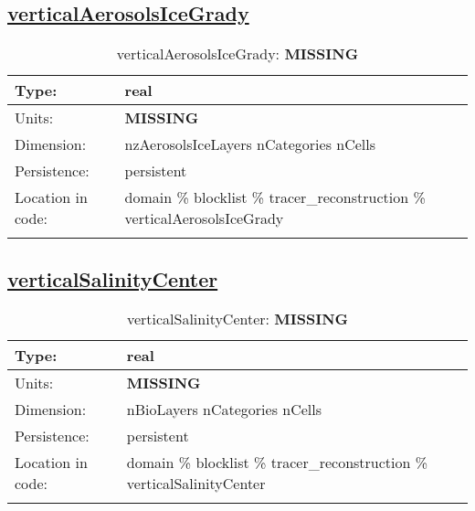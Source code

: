 \subsection[verticalAerosolsIceGrady]{\hyperref[sec:var_tab_tracer_reconstruction]{verticalAerosolsIceGrady}}
\label{subsec:var_sec_tracer_reconstruction_verticalAerosolsIceGrady}
\begin{center}
\begin{longtable}{| p{2.0in} | p{4.0in} |}
        \hline 
        Type: & real \\
        \hline 
        Units: & {\bf \color{red} MISSING} \\
        \hline 
        Dimension: & nzAerosolsIceLayers nCategories nCells \\
        \hline 
        Persistence: & persistent \\
        \hline 
         Location in code: & domain \% blocklist \% tracer\_reconstruction \% verticalAerosolsIceGrady \\
         \hline 
    \caption{verticalAerosolsIceGrady: {\bf \color{red} MISSING}}
\end{longtable}
\end{center}
\subsection[verticalSalinityCenter]{\hyperref[sec:var_tab_tracer_reconstruction]{verticalSalinityCenter}}
\label{subsec:var_sec_tracer_reconstruction_verticalSalinityCenter}
\begin{center}
\begin{longtable}{| p{2.0in} | p{4.0in} |}
        \hline 
        Type: & real \\
        \hline 
        Units: & {\bf \color{red} MISSING} \\
        \hline 
        Dimension: & nBioLayers nCategories nCells \\
        \hline 
        Persistence: & persistent \\
        \hline 
         Location in code: & domain \% blocklist \% tracer\_reconstruction \% verticalSalinityCenter \\
         \hline 
    \caption{verticalSalinityCenter: {\bf \color{red} MISSING}}
\end{longtable}
\end{center}
